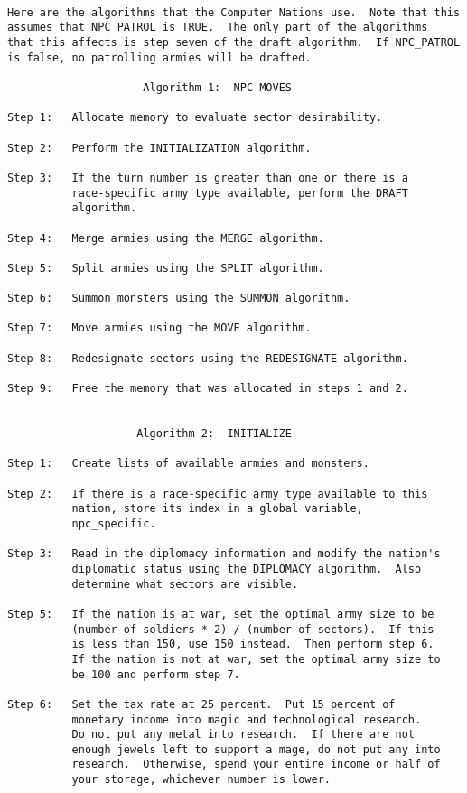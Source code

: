 \begin{verbatim}

Here are the algorithms that the Computer Nations use.  Note that this
assumes that NPC_PATROL is TRUE.  The only part of the algorithms
that this affects is step seven of the draft algorithm.  If NPC_PATROL
is false, no patrolling armies will be drafted.

                     Algorithm 1:  NPC MOVES

Step 1:   Allocate memory to evaluate sector desirability.

Step 2:   Perform the INITIALIZATION algorithm.

Step 3:   If the turn number is greater than one or there is a
          race-specific army type available, perform the DRAFT
          algorithm.

Step 4:   Merge armies using the MERGE algorithm.

Step 5:   Split armies using the SPLIT algorithm.

Step 6:   Summon monsters using the SUMMON algorithm.

Step 7:   Move armies using the MOVE algorithm.

Step 8:   Redesignate sectors using the REDESIGNATE algorithm.

Step 9:   Free the memory that was allocated in steps 1 and 2.


                    Algorithm 2:  INITIALIZE

Step 1:   Create lists of available armies and monsters.

Step 2:   If there is a race-specific army type available to this
          nation, store its index in a global variable,
          npc_specific.

Step 3:   Read in the diplomacy information and modify the nation's
          diplomatic status using the DIPLOMACY algorithm.  Also
          determine what sectors are visible.

Step 5:   If the nation is at war, set the optimal army size to be
          (number of soldiers * 2) / (number of sectors).  If this
          is less than 150, use 150 instead.  Then perform step 6. 
          If the nation is not at war, set the optimal army size to
          be 100 and perform step 7.

Step 6:   Set the tax rate at 25 percent.  Put 15 percent of
          monetary income into magic and technological research. 
          Do not put any metal into research.  If there are not
          enough jewels left to support a mage, do not put any into
          research.  Otherwise, spend your entire income or half of
          your storage, whichever number is lower.


\end{verbatim}
